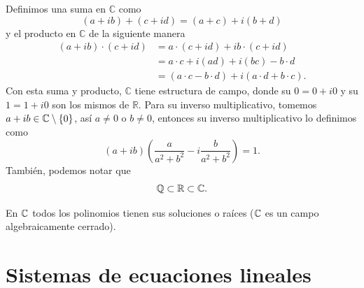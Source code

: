 \documentclass[12pt,a4paper]{book}
\begin{document}
    Definimos una suma en $\mathbb{C}$ como
    \begin{equation*}
        (a + ib) + (c + id) = (a + c) + i(b + d)
    \end{equation*}
    y el producto en $\mathbb{C}$ de la siguiente manera
    \begin{align*}
        (a + ib) \cdot (c + id) & = a \cdot (c + id) + ib \cdot (c + id)\\
        & = a \cdot c + i(ad) + i(bc) - b\cdot d\\
        & = (a \cdot c - b \cdot d) + i(a \cdot d + b \cdot c).
    \end{align*}
    Con esta suma y producto, $\mathbb{C}$ tiene estructura de campo, donde su $0 = 0 + i0$ y su $1 = 1+ i0$ son los mismos de $\mathbb{R}.$ 
    Para su inverso multiplicativo, tomemos $a + ib \in \mathbb{C} \setminus \{0\}$, así $a \ne 0$ o $b\ne 0$, entonces su inverso multiplicativo lo definimos como
    \begin{equation*}
        (a + ib) \left( \frac{a}{a^{2} + b^{2}} - i \frac{b}{a^{2} + b^{2}} \right) = 1.
    \end{equation*}
    También, podemos notar que
    \begin{equation*}
        \mathbb{Q} \subset \mathbb{R} \subset \mathbb{C}.
    \end{equation*}
    
    \begin{teorema}
    \label{teo:1}
        En $\mathbb{C}$ todos los polinomios tienen sus soluciones o raíces ($\mathbb{C}$ es un campo algebraicamente cerrado).
    \end{teorema}
    
    \section{Sistemas de ecuaciones lineales}
    
\end{document}
